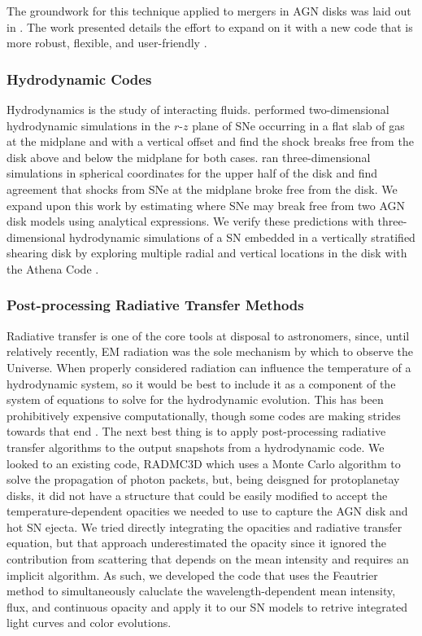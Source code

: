 The groundwork for this technique applied to mergers in AGN disks was laid out in \citet{McKernan+20a,McKernan+20b}.
The work presented details the effort to expand on it with a new code that is more robust, flexible, and user-friendly \citep{McKernan+25-mcfactsI,Cook+25,Delfavero+25-mcfactsIII}.

\subsubsection{Hydrodynamic Codes}

Hydrodynamics is the study of interacting fluids.
\citet{Grishin+21} performed two-dimensional hydrodynamic simulations in the $r$-$z$ plane of SNe occurring in a flat slab of gas at the midplane and with a vertical offset and find the shock breaks free from the disk above and below the midplane for both cases.
\citet{Moranchel+21} ran three-dimensional simulations in spherical coordinates for the upper half of the disk and find agreement that shocks from SNe at the midplane broke free from the disk.
We expand upon this work by estimating where SNe may break free from two AGN disk models using analytical expressions.
We verify these predictions with three-dimensional hydrodynamic simulations of a SN embedded in a vertically stratified shearing disk by exploring multiple radial and vertical locations in the disk with the Athena Code \citep{Stone+08,StoneGardiner10}.

\subsubsection{Post-processing Radiative Transfer Methods}
Radiative transfer is one of the core tools at disposal to astronomers, since, until relatively recently, EM radiation was the sole mechanism by which to observe the Universe.
When properly considered radiation can influence the temperature of a hydrodynamic system, so it would be best to include it as a component of the system of equations to solve for the hydrodynamic evolution.
This has been prohibitively expensive computationally, though some codes are making strides towards that end \citep[e.g.,][]{Jiang+14,White+23}.
The next best thing is to apply post-processing radiative transfer algorithms to the output snapshots from a hydrodynamic code.
We looked to an existing code, RADMC3D which uses a Monte Carlo algorithm to solve the propagation of photon packets, but, being deisgned for protoplanetay disks, it did not have a structure that could be easily modified to accept the temperature-dependent opacities we needed to use to capture the AGN disk and hot SN ejecta.
We tried directly integrating the opacities and radiative transfer equation, but that approach underestimated the opacity since it ignored the contribution from scattering that depends on the mean intensity and requires an implicit algorithm.
As such, we developed the  code that uses the Feautrier method to simultaneously caluclate the wavelength-dependent mean intensity, flux, and continuous opacity and apply it to our SN models to retrive integrated light curves and color evolutions.





